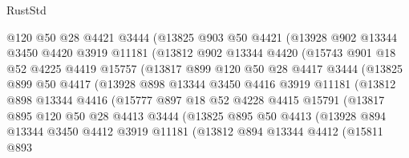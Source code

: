 \begin{lexlean}{RustStd}
\begin{coremodule}
              @120
              @50
              @28
              @4421
              @3444
              (@13825
                @903
                @50
                @4421
                (@13928
                  @902
                  @13344
                  @3450
                  @4420
                  @3919
                  @11181
                  (@13812
                    @902
                    @13344
                    @4420
                    (@15743
                      @901
                      @18
                      @52
                      @4225
                      @4419
                      @15757
                      (@13817
                        @899
                        @120
                        @50
                        @28
                        @4417
                        @3444
                        (@13825
                          @899
                          @50
                          @4417
                          (@13928
                            @898
                            @13344
                            @3450
                            @4416
                            @3919
                            @11181
                            (@13812
                              @898
                              @13344
                              @4416
                              (@15777
                                @897
                                @18
                                @52
                                @4228
                                @4415
                                @15791
                                (@13817
                                  @895
                                  @120
                                  @50
                                  @28
                                  @4413
                                  @3444
                                  (@13825
                                    @895
                                    @50
                                    @4413
                                    (@13928
                                      @894
                                      @13344
                                      @3450
                                      @4412
                                      @3919
                                      @11181
                                      (@13812
                                        @894
                                        @13344
                                        @4412
                                        (@15811
                                          @893

\end{coremodule}
\end{lexlean}
